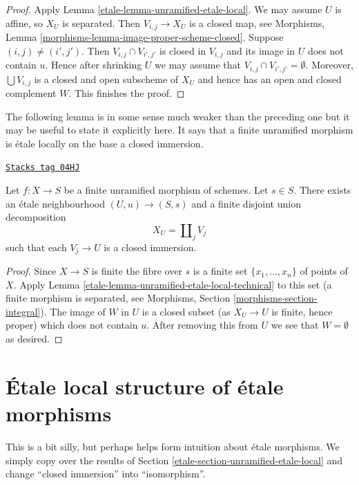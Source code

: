 \begin{proof}

Apply
Lemma \ref{etale-lemma-unramified-etale-local}.
We may assume $U$ is affine, so $X_U$ is separated.
Then $V_{i, j} \to X_U$ is a closed map, see
Morphisms, Lemma \ref{morphisms-lemma-image-proper-scheme-closed}.
Suppose $(i, j) \not = (i', j')$.
Then $V_{i, j} \cap V_{i', j'}$ is closed in $V_{i, j}$ and
its image in $U$ does not contain $u$.
Hence after shrinking $U$ we may assume that
$V_{i, j} \cap V_{i', j'} = \emptyset$. Moreover, $\bigcup V_{i, j}$ is
a closed and open subscheme of $X_U$ and hence has an open and closed
complement $W$. This finishes the proof.
\end{proof}

The following lemma is in some sense much weaker than the preceding one
but it may be useful to state it explicitly here. It says that a finite
unramified morphism is \'etale locally on the base a closed immersion.

\begin{lemma}
\label{etale-lemma-finite-unramified-etale-local}
\href{https://stacks.math.columbia.edu/tag/04HJ}{\texttt{Stacks tag 04HJ}}

Let $f : X \to S$ be a finite unramified morphism of schemes.
Let $s \in S$.
There exists an \'etale neighbourhood $(U, u) \to (S, s)$
and a finite disjoint union decomposition
$$
X_U = \coprod\nolimits_j V_j
$$
such that each $V_j \to U$ is a closed immersion.
\end{lemma}

\begin{proof}

Since $X \to S$ is finite the fibre over $s$ is a finite set
$\{x_1, \ldots, x_n\}$ of points of $X$. Apply
Lemma \ref{etale-lemma-unramified-etale-local-technical}
to this set (a finite morphism is separated, see
Morphisms, Section \ref{morphisms-section-integral}).
The image of $W$ in $U$ is a closed
subset (as $X_U \to U$ is finite, hence proper) which does not
contain $u$. After removing this from $U$ we see that $W = \emptyset$
as desired.
\end{proof}

\section{\'Etale local structure of \'etale morphisms}
\label{etale-section-etale-local-etale}
This is a bit silly, but perhaps helps form intuition about \'etale
morphisms. We simply copy over the results of
Section \ref{etale-section-unramified-etale-local}
and change ``closed immersion'' into ``isomorphism''.

